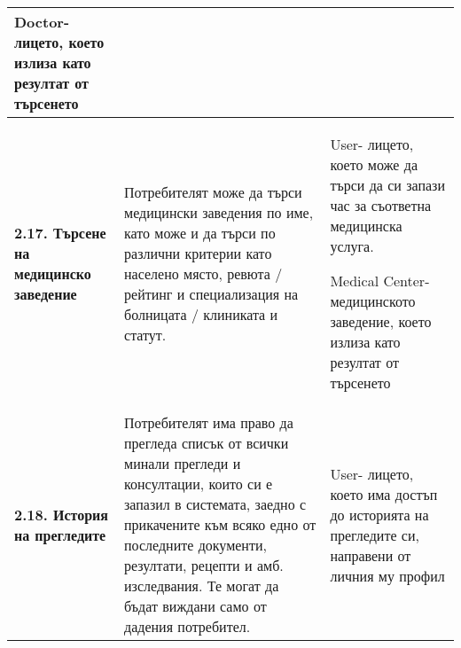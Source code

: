 \documentclass[a4paper,12pt]{article}
\begin{document}
\begin{xltabular}{\textwidth}{|p{4cm}|p{6cm}|p{6cm}|}
Doctor- лицето, което излиза като резултат от търсенето \\
\hline
{}\textbf{2.17. Търсене на медицинско заведение} &
Потребителят може да търси медицински заведения по име, като може и да търси по различни критерии като населено място, ревюта / рейтинг и специализация на болницата / клиниката и статут. &
User- лицето, което може да търси да си запази час за съответна медицинска услуга.

Medical Center- медицинското заведение, което излиза като резултат от търсенето \\
\hline
{}\textbf{2.18. История на прегледите} &
Потребителят има право да прегледа списък от всички минали прегледи и консултации, които си е запазил в системата, заедно с прикачените към всяко едно от последните документи, резултати, рецепти и амб. изследвания. Те могат да бъдат виждани само от дадения потребител. &
User- лицето, което има достъп до историята на прегледите си, направени от личния му профил \\
\hline
\end{xltabular}
\end{document}
